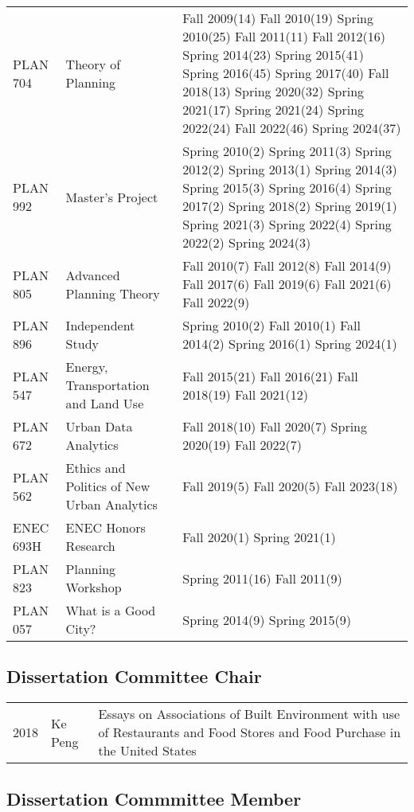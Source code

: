 \documentclass[11pt,a4paper,]{awesome-cv}
\begin{document}
\begin{tabular}{lp{4.5cm}p{9.5cm}}
  PLAN 704 & Theory of Planning & Fall 2009(14) Fall 2010(19) Spring 2010(25) Fall 2011(11) Fall 2012(16) Spring 2014(23) Spring 2015(41) Spring 2016(45) Spring 2017(40) Fall 2018(13) Spring 2020(32) Spring 2021(17) Spring 2021(24) Spring 2022(24) Fall 2022(46) Spring 2024(37) \\ 
  PLAN 992 & Master's Project & Spring 2010(2) Spring 2011(3) Spring 2012(2) Spring 2013(1) Spring 2014(3) Spring 2015(3) Spring 2016(4) Spring 2017(2) Spring 2018(2) Spring 2019(1) Spring 2021(3) Spring 2022(4) Spring 2022(2) Spring 2024(3) \\ 
  PLAN 805 & Advanced Planning Theory & Fall 2010(7) Fall 2012(8) Fall 2014(9) Fall 2017(6) Fall 2019(6) Fall 2021(6) Fall 2022(9) \\ 
  PLAN 896 & Independent Study & Spring 2010(2) Fall 2010(1) Fall 2014(2) Spring 2016(1) Spring 2024(1) \\ 
  PLAN 547 & Energy, Transportation and Land Use & Fall 2015(21) Fall 2016(21) Fall 2018(19) Fall 2021(12) \\ 
  PLAN 672 & Urban Data Analytics & Fall 2018(10) Fall 2020(7) Spring 2020(19) Fall 2022(7) \\ 
  PLAN 562 & Ethics and Politics of New Urban Analytics & Fall 2019(5) Fall 2020(5) Fall 2023(18) \\ 
  ENEC 693H & ENEC Honors Research & Fall 2020(1) Spring 2021(1) \\ 
  PLAN 823 & Planning Workshop & Spring 2011(16) Fall 2011(9) \\ 
  PLAN 057 & What is a Good City? & Spring 2014(9) Spring 2015(9) \\ 
  \end{tabular}

\subsection{Dissertation Committee
Chair}\label{dissertation-committee-chair}

\begin{tabular}{lp{3cm}p{12cm}}
  2018 & Ke Peng & Essays on Associations of Built Environment with use of Restaurants and Food Stores and Food Purchase in the United States \\ 
  \end{tabular}

\subsection{Dissertation Commmittee
Member}\label{dissertation-commmittee-member}
\end{document}
